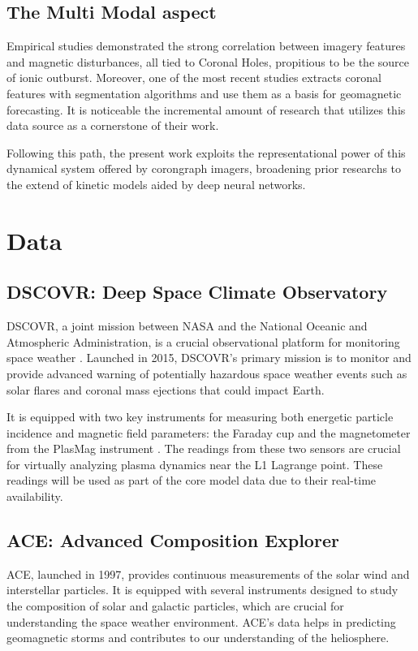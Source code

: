 \documentclass[12pt]{article}
\begin{document}
\subsection{The Multi Modal aspect}

Empirical studies demonstrated the strong correlation between imagery features and magnetic disturbances, all tied to Coronal Holes, propitious to be the source of ionic outburst.\cite{cme_pred_2} Moreover, one of the most recent studies extracts coronal features with segmentation algorithms and use them as a basis for geomagnetic forecasting.\cite{collin2024forecastinghighspeedsolarwind} It is noticeable the incremental amount of research that utilizes this data source as a cornerstone of their work.

Following this path, the present work exploits the representational power of this dynamical system offered by corongraph imagers, broadening prior researchs to the extend of kinetic models aided by deep neural networks.

\section{Data}

\subsection{DSCOVR: Deep Space Climate Observatory}
DSCOVR, a joint mission between NASA and the National Oceanic and Atmospheric Administration, is a crucial observational platform for monitoring space weather \cite{nasa_dscovr}. Launched in 2015, DSCOVR's primary mission is to monitor and provide advanced warning of potentially hazardous space weather events such as solar flares and coronal mass ejections that could impact Earth.

It is equipped with two key instruments for measuring both energetic particle incidence and magnetic field parameters: the Faraday cup and the magnetometer from the PlasMag instrument \cite{nasa_dscovr}. The readings from these two sensors are crucial for virtually analyzing plasma dynamics near the L1 Lagrange point. These readings will be used as part of the core model data due to their real-time availability.

\subsection{ACE: Advanced Composition Explorer}
ACE, launched in 1997, provides continuous measurements of the solar wind and interstellar particles. It is equipped with several instruments designed to study the composition of solar and galactic particles, which are crucial for understanding the space weather environment. ACE's data helps in predicting geomagnetic storms and contributes to our understanding of the heliosphere.
\end{document}
